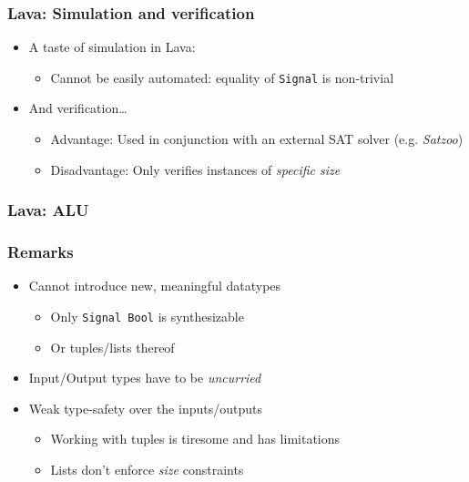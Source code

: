 \documentclass{beamer}
\begin{document}
            \begin{frame}
                \frametitle{Lava: Simulation and verification}

                \begin{itemize}
                    \item A taste of simulation in Lava:
                        \begin{itemize}
                            \item Cannot be easily automated: equality of \texttt{Signal} is non-trivial
                        \end{itemize}

                    \item And verification\ldots
                        \begin{itemize}
                            \item Advantage: Used in conjunction with an external SAT solver (e.g. \emph{Satzoo})
                            \item Disadvantage: Only verifies instances of \emph{specific size}
                        \end{itemize}
                \end{itemize}
            \end{frame}

            \begin{frame}
                \frametitle{Lava: ALU}
            \end{frame}

            \begin{frame}
                \frametitle{Remarks}

                \begin{itemize}
                    \item Cannot introduce new, meaningful datatypes
                        \begin{itemize}
                            \item Only \texttt{Signal Bool} is synthesizable
                            \item Or tuples/lists thereof
                        \end{itemize}
                    \item Input/Output types have to be \emph{uncurried}
                    \item Weak type-safety over the inputs/outputs
                        \begin{itemize}
                            \item Working with tuples is tiresome and has limitations
                            \item Lists don't enforce \emph{size} constraints
                        \end{itemize}
                \end{itemize}
            \end{frame}
\end{document}
